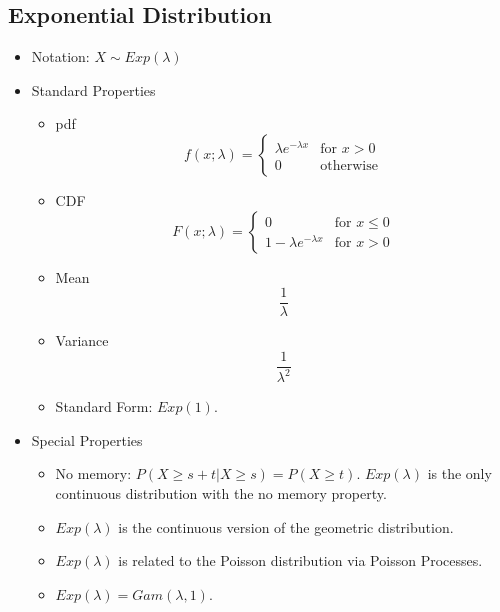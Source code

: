 \documentclass[12pt]{article} %
\begin{document}
\subsection{Exponential Distribution}
\begin{itemize}
\item Notation: $X\sim Exp(\lambda)$

\item Standard Properties

\begin{minipage}{3.5in}
\begin{itemize}[label=$\star$]
\item pdf $$f(x;\lambda) = \left\{\begin{matrix}
\lambda e^{-\lambda x}& \textrm{for } x>0\\ 0&\textrm {otherwise}
\end{matrix}\right.$$
\item CDF $$F(x;\lambda) = \left\{\begin{matrix}
0&\textrm{for } x\leq 0\\ 1-\lambda e^{-\lambda x}& \textrm{for } x>0
\end{matrix}\right.$$
\end{itemize}
\end{minipage}
\hspace{1in}
\begin{minipage}{3in}
\begin{itemize}[label=$\star$]
\item Mean $$\frac1\lambda$$
\item Variance $$\frac1{\lambda^2}$$
\item Standard Form: $Exp(1)$.
\end{itemize}
\end{minipage}
\item Special Properties
\begin{itemize}[label=$\star$]
\item No memory: $P(X\geq s+t|X\geq s)=P(X\geq t)$. $Exp(\lambda)$ is the only continuous distribution with the no memory property.
\item $Exp(\lambda)$ is the continuous version of the geometric distribution.
\item $Exp(\lambda)$ is related to the Poisson distribution via Poisson Processes.
\item $Exp(\lambda) = Gam(\lambda,1)$.
\end{itemize}
\end{itemize}
\end{document}

